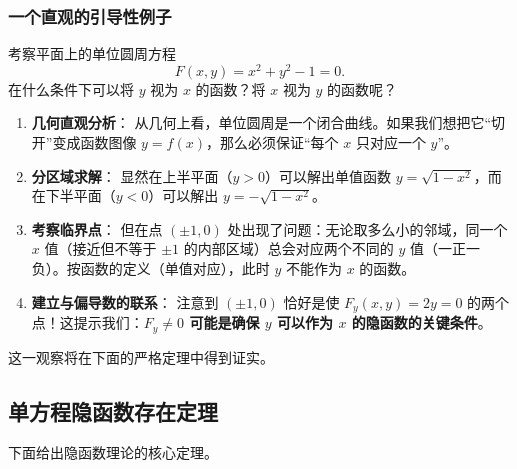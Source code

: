\documentclass[lang=cn,11pt]{elegantbook}
\begin{document}
\subsubsection*{一个直观的引导性例子}

\begin{exercise}[单位圆周上的隐函数] \label{ex:unit-circle-implicit}
考察平面上的单位圆周方程
\[
F(x,y)=x^2+y^2-1=0.
\]
在什么条件下可以将 $y$ 视为 $x$ 的函数？将 $x$ 视为 $y$ 的函数呢？
\end{exercise}

\begin{solution}
\begin{enumerate}
  \item \textbf{几何直观分析}：
  从几何上看，单位圆周是一个闭合曲线。如果我们想把它“切开”变成函数图像 $y=f(x)$，那么必须保证“每个 $x$ 只对应一个 $y$”。
  \item \textbf{分区域求解}：
  显然在上半平面（$y>0$）可以解出单值函数 $y=\sqrt{1-x^2}$，而在下半平面（$y<0$）可以解出 $y=-\sqrt{1-x^2}$。
  \item \textbf{考察临界点}：
  但在点 $(\pm 1,0)$ 处出现了问题：无论取多么小的邻域，同一个 $x$ 值（接近但不等于 $\pm 1$ 的内部区域）总会对应两个不同的 $y$ 值（一正一负）。按函数的定义（单值对应），此时 $y$ 不能作为 $x$ 的函数。
  \item \textbf{建立与偏导数的联系}：
  注意到 $(\pm 1,0)$ 恰好是使 $F_y(x,y)=2y=0$ 的两个点！这提示我们：\textbf{$F_y \neq 0$ 可能是确保 $y$ 可以作为 $x$ 的隐函数的关键条件}。
\end{enumerate}
\end{solution}

这一观察将在下面的严格定理中得到证实。


\subsection{单方程隐函数存在定理}

下面给出隐函数理论的核心定理。
\end{document}
